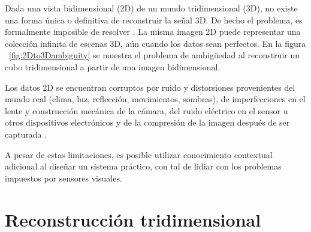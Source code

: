 Dada una vista bidimensional (2D) de un mundo tridimensional (3D), no existe una forma \'{u}nica o definitiva de reconstruir la señal 3D. De hecho el problema, es formalmente imposible de resolver \cite{Faugeras_Luong_2001,Bradski_Kaehler_2008,Hartley_Zisserman_2003}. La misma imagen 2D puede representar una colecci\'{o}n infinita de escenas 3D, a\'{u}n cuando los datos sean perfectos. En la figura ~\ref{fig:2Dto3Dambiguity} se muestra el problema de ambigüedad al reconstruir un cubo tridimensional a partir de una imagen bidimensional.

Los datos 2D se encuentran corruptos por ruido y distorsiones \cite{Freeman_Szeliski_2006,Thong_Sim_Phang_2001} provenientes del mundo real (clima, luz, reflecci\'{o}n, movimientos, sombras), de imperfecciones en el lente y construcci\'{o}n mec\'{a}nica de la c\'{a}mara, del ruido el\'{e}ctrico en el sensor u otros dispositivos electr\'{o}nicos y de la compresi\'{o}n de la imagen despu\'{e}s de ser capturada \cite{Szeliski_2010,Shah_1983,Faugeras_Luong_2001}.

A pesar de estas limitaciones, es posible utilizar conocimiento contextual adicional al diseñar un sistema pr\'{a}ctico, con tal de lidiar con los problemas impuestos por sensores visuales.

\section{Reconstrucci\'{o}n tridimensional}

